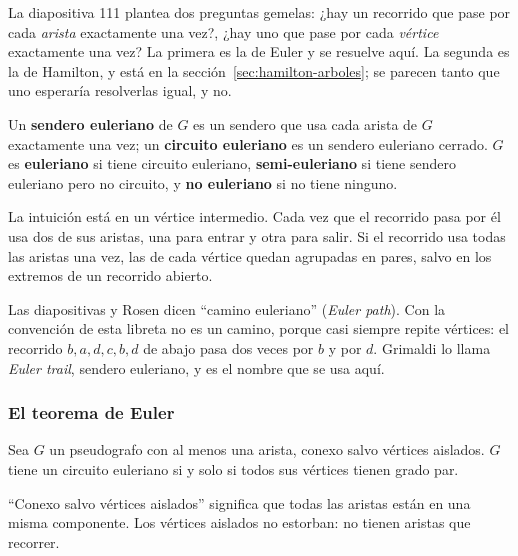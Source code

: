 \documentclass[11pt,letterpaper]{article}
\begin{document}
La diapositiva 111 plantea dos preguntas gemelas: ¿hay un recorrido
que pase por cada \emph{arista} exactamente una vez?, ¿hay uno que pase
por cada \emph{vértice} exactamente una vez? La primera es la de
Euler y se resuelve aquí. La segunda es la de Hamilton, y está en la
sección~\ref{sec:hamilton-arboles}; se parecen tanto que uno esperaría
resolverlas igual, y no.

\begin{definicion}
  \label{def:euleriano}
  Un \textbf{sendero euleriano} de $G$ es un sendero que usa cada
  arista de $G$ exactamente una vez; un \textbf{circuito euleriano} es
  un sendero euleriano cerrado. $G$ es \textbf{euleriano} si tiene
  circuito euleriano, \textbf{semi-euleriano} si tiene sendero
  euleriano pero no circuito, y \textbf{no euleriano} si no tiene
  ninguno.
\end{definicion}

La intuición está en un vértice intermedio. Cada vez que el recorrido
pasa por él usa dos de sus aristas, una para entrar y otra para salir.
Si el recorrido usa todas las aristas una vez, las de cada vértice
quedan agrupadas en pares, salvo en los extremos de un recorrido
abierto.

\begin{ojo}
  Las diapositivas y Rosen dicen ``camino euleriano'' (\textit{Euler
  path}). Con la convención de esta libreta no es un camino, porque casi
  siempre repite vértices: el recorrido $b, a, d, c, b, d$ de abajo
  pasa dos veces por $b$ y por $d$. Grimaldi lo llama \textit{Euler
  trail}, sendero euleriano, y es el nombre que se usa aquí.
\end{ojo}

\subsubsection*{El teorema de Euler}

\begin{teorema}[Euler]
  \label{teo:euler-circuito}
  Sea $G$ un pseudografo con al menos una arista, conexo salvo vértices
  aislados. $G$ tiene un circuito euleriano si y solo si todos sus
  vértices tienen grado par.
\end{teorema}

``Conexo salvo vértices aislados'' significa que todas las aristas
están en una misma componente. Los vértices aislados no estorban: no
tienen aristas que recorrer.
\end{document}
